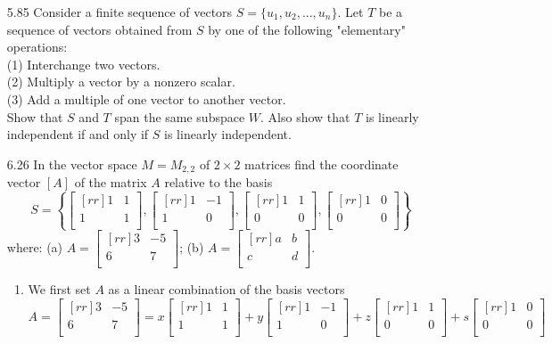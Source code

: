 \documentclass[12pt]{article}
\theoremstyle{plain}
\theoremstyle{definition}
\theoremstyle{plain}
\begin{document}
\begin{enumerate}
\item[5.85]Consider a finite sequence of vectors $S=\{u_1,u_2,...,u_n\}$. Let $T$ be a sequence of vectors obtained from $S$ by one of the following "elementary" operations:\\
(1) Interchange two vectors.\\
(2) Multiply a vector by a nonzero scalar.\\
(3) Add a multiple of one vector to another vector.\\
Show that $S$ and $T$ span the same subspace $W$. Also show that $T$ is linearly independent if and only if $S$ is linearly independent.

\item[6.26]In the vector space $M=M_{2,2}$ of $2\times 2$ matrices find the coordinate vector $[A]$ of the matrix $A$ relative to the basis
\[ S=\left\{ \begin{bmatrix}[rr]1&1\\1&1\\\end{bmatrix},\begin{bmatrix}[rr]1&-1\\1&0\\\end{bmatrix},\begin{bmatrix}[rr]1&1\\0&0\\\end{bmatrix},\begin{bmatrix}[rr]1&0\\0&0\\\end{bmatrix}\right\} \]
where: (a) $A=\begin{bmatrix}[rr]3&-5\\6&7\\\end{bmatrix}$; (b) $A=\begin{bmatrix}[rr]a&b\\c&d\\\end{bmatrix}$.
	\begin{enumerate}
	\item We first set $A$ as a linear combination of the basis vectors
		\[ A=\begin{bmatrix}[rr]3&-5\\6&7\\\end{bmatrix} = x\begin{bmatrix}[rr]1&1\\1&1\\\end{bmatrix}+y\begin{bmatrix}[rr]1&-1\\1&0\\\end{bmatrix}+z\begin{bmatrix}[rr]1&1\\0&0\\\end{bmatrix}+s\begin{bmatrix}[rr]1&0\\0&0\\\end{bmatrix} \]

\end{enumerate}
\end{enumerate}
\end{document}
